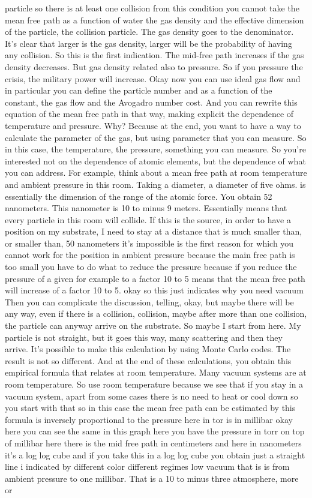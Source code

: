 particle so there is at least one collision from this condition you cannot take the mean free path as a function of water the gas density and the effective dimension of the particle, the collision particle. The gas density goes to the denominator. It's clear that larger is the gas density, larger will be the probability of having any collision. So this is the first indication. The mid-free path increases if the gas density decreases. But gas density related also to pressure. So if you pressure the crisis, the military power will increase.
Okay now you can use ideal gas flow and in particular you can define the particle number and as a function of the constant, the gas flow and the Avogadro number cost. And you can rewrite this equation of the mean free path in that way, making explicit the dependence of temperature and pressure. Why? Because at the end, you want to have a way to calculate the parameter of the gas, but using parameter that you can measure. So in this case, the temperature, the pressure, something you can measure. So you're interested not on the dependence of atomic elements, but the dependence of what you can address. For example, think about a mean free path at room temperature and ambient pressure in this room. Taking a diameter, a diameter of five ohms. is essentially the dimension of the range of the atomic force. You obtain 52 nanometers. This nanometer is 10 to minus 9 meters. Essentially means that every particle in this room will collide. If this is the source, in order to have a position on my substrate, I need to stay at a distance that is much smaller than, or smaller than, 50 nanometers it's impossible is the first reason for which you cannot work for the position in ambient pressure because the main free path is too small you have to do what to reduce the pressure because if you reduce the pressure of a given for example to a factor 10 to 5 means that the mean free path will increase of a factor 10 to 5. okay so this just indicates why you need vacuum Then you can complicate the discussion, telling, okay, but maybe there will be any way, even if there is a collision, collision, maybe after more than one collision, the particle can anyway arrive on the substrate. So maybe I start from here. My particle is not straight, but it goes this way, many scattering and then they arrive. It's possible to make this calculation by using Monte Carlo codes. The result is not so different. And at the end of these calculations, you obtain this empirical formula that relates at room temperature. Many vacuum systems are at room temperature. So use room temperature because we see that if you stay in a vacuum system, apart from some cases there is no need to heat or cool down so you start with that so in this case the mean free path can be estimated by this formula is inversely proportional to the pressure here in tor is in millibar okay here you can see the same in this graph here you have the pressure in torr on top of millibar here there is the mid free path in centimeters and here in nanometers it's a log log cube and if you take this in a log log cube you obtain just a straight line i indicated by different color different regimes low vacuum that is is from ambient pressure to one millibar. That is a 10 to minus three atmosphere, more or 